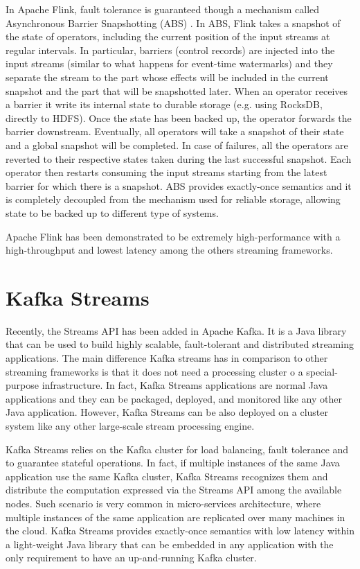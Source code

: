 In Apache Flink, fault tolerance is guaranteed though a mechanism called Asynchronous Barrier Snapshotting (ABS) \cite{apacheflinkstreamandbatch}. In ABS, Flink takes a snapshot of the state of operators, including the current position of the input streams at regular intervals. In particular, barriers (control records) are injected into the input streams (similar to what happens for event-time watermarks) and they separate the stream to the part whose effects will be included in the current snapshot and the part that will be snapshotted later. When an operator receives a barrier it write its internal state to durable storage (e.g. using RocksDB, directly to HDFS). Once the state has been backed up, the operator forwards the barrier downstream. Eventually, all operators will take a snapshot of their state and a global snapshot will be completed. In case of failures, all the operators are reverted to their respective states taken during the last successful snapshot. Each operator then restarts consuming the input streams starting from the latest barrier for which there is a snapshot. ABS provides exactly-once semantics and it is completely decoupled from the mechanism used for reliable storage, allowing state to be backed up to different type of systems.

Apache Flink has been demonstrated \cite{yahoobenchmarkingonline, zalandobenchmarkingonline} to be extremely high-performance with a high-throughput and lowest latency among the others streaming frameworks.
\section{Kafka Streams}
Recently, the Streams API \cite{kafkastreamsonline} has been added in Apache Kafka. It is a Java library that can be used to build highly scalable, fault-tolerant and distributed streaming applications. The main difference Kafka streams has in comparison to other streaming frameworks is that it does not need a processing cluster o a special-purpose infrastructure. In fact, Kafka Streams applications are normal Java applications and they can be packaged, deployed, and monitored like any other Java application. However, Kafka Streams can be also deployed on a cluster system like any other large-scale stream processing engine.

Kafka Streams relies on the Kafka cluster for load balancing, fault tolerance and to guarantee stateful operations. In fact, if multiple instances of the same Java application use the same Kafka cluster, Kafka Streams recognizes them and distribute the computation expressed via the Streams API among the available nodes. Such scenario is very common in micro-services architecture, where multiple instances of the same application are replicated over many machines in the cloud. Kafka Streams provides exactly-once semantics with low latency within a light-weight Java library that can be embedded in any application with the only requirement to have an up-and-running Kafka cluster.

